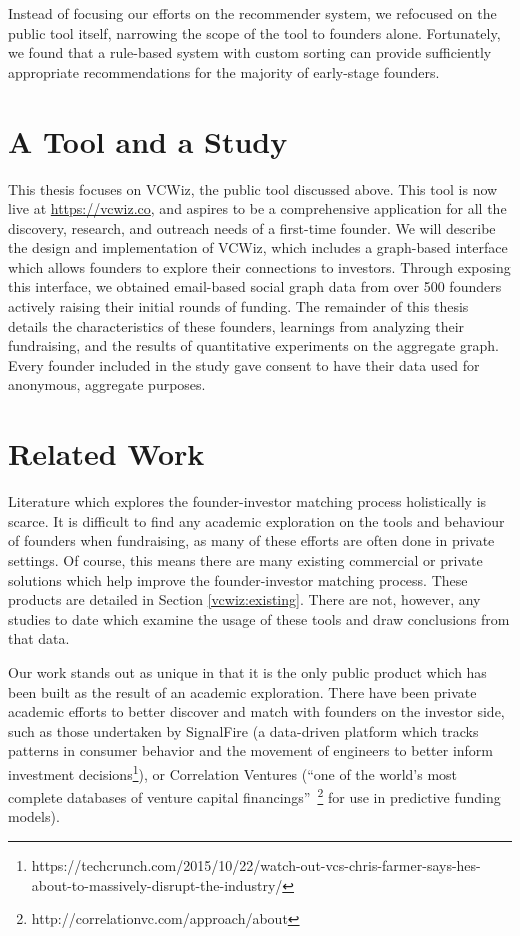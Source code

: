 Instead of focusing our efforts on the recommender system, we refocused on the public tool itself, narrowing the scope of the tool to founders alone. Fortunately, we found that a rule-based system with custom sorting can provide sufficiently appropriate recommendations for the majority of early-stage founders.

\section{A Tool and a Study}

This thesis focuses on VCWiz, the public tool discussed above. This tool is now live at \url{https://vcwiz.co}, and aspires to be a comprehensive application for all the discovery, research, and outreach needs of a first-time founder. We will describe the design and implementation of VCWiz, which includes a graph-based interface which allows founders to explore their connections to investors. Through exposing this interface, we obtained email-based social graph data from over 500 founders actively raising their initial rounds of funding. The remainder of this thesis details the characteristics of these founders, learnings from analyzing their fundraising, and the results of quantitative experiments on the aggregate graph. Every founder included in the study gave consent to have their data used for anonymous, aggregate purposes.

\section{Related Work}

Literature which explores the founder-investor matching process holistically is scarce. It is difficult to find any academic exploration on the tools and behaviour of founders when fundraising, as many of these efforts are often done in private settings. Of course, this means there are many existing commercial or private solutions which help improve the founder-investor matching process. These products are detailed in Section \ref{vcwiz:existing}. There are not, however, any studies to date which examine the usage of these tools and draw conclusions from that data.

Our work stands out as unique in that it is the only public product which has been built as the result of an academic exploration. There have been private academic efforts to better discover and match with founders on the investor side, such as those undertaken by SignalFire (a data-driven platform which tracks patterns in consumer behavior and the movement of engineers to better inform investment decisions\footnote{https://techcrunch.com/2015/10/22/watch-out-vcs-chris-farmer-says-hes-about-to-massively-disrupt-the-industry/}), or Correlation Ventures (``one of the world's most complete databases of venture capital financings''~\footnote{http://correlationvc.com/approach/about} for use in predictive funding models).


